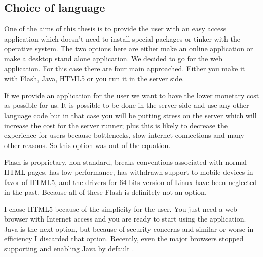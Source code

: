 \documentclass[a4paper,10pt]{article}
\begin{document}
  \subsection{Choice of language}

    One of the aims of this thesis is to provide the user with an easy access application which doesn't need to install special packages or tinker with the operative system. The two options here are either make an online application or make a desktop stand alone application. We decided to go for the web application. For this case there are four main approached. Either you make it with Flash, Java, HTML5 or you run it in the server side.\vspace{3 mm}

    If we provide an application for the user we want to have the lower monetary cost as possible for us. It is possible to be done in the server-side and use any other language code but in that case you will be putting stress on the server which will increase the cost for the server runner; plus this is likely to decrease the experience for users because bottlenecks, slow internet connections and many other reasons. So this option was out of the equation.\vspace{3 mm}

    Flash is proprietary, non-standard, breaks conventions associated with normal HTML pages, has low performance, has withdrawn support to mobile devices in favor of HTML5, and the drivers for 64-bits version of Linux have been neglected in the past. Because all of these Flash is definitely not an option.\vspace{3 mm}

    I chose HTML5 because of the simplicity for the user. You just need a web browser with Internet access and you are ready to start using the application. Java is the next option, but because of security concerns \cite{javasecurity04} \cite{javasecurity03} \cite{javasecurity02} \cite{javasecurity01} and similar or worse in efficiency \cite{benchmarks01} \cite{benchmarks02} I discarded that option. Recently, even the major browsers stopped supporting and enabling Java by default \cite{javasecurity05}.\vspace{3 mm}
\end{document}
